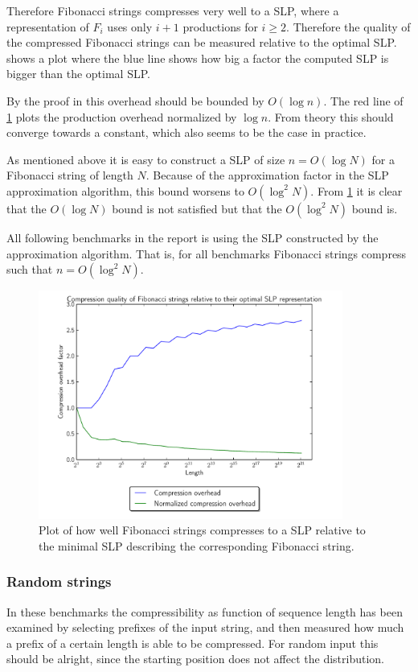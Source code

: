 \documentclass[twoside,11pt,openright]{report}
\begin{document}
Therefore Fibonacci strings compresses very well to a SLP, where a representation of $F_{i}$ uses only $i + 1$ productions for $i \geq 2$. Therefore the quality of the compressed Fibonacci strings can be measured relative to the optimal SLP.  shows a plot where the blue line shows how big a factor the computed SLP is bigger than the optimal SLP.

By the proof in \cite{Rytter2003211} this overhead should be bounded by $O(\log{n})$. The red line of \cref{fig:compression:quality:fibonacci} plots the production overhead normalized by $\log{n}$. From theory this should converge towards a constant, which also seems to be the case in practice.

As mentioned above it is easy to construct a SLP of size $n = O(\log{N})$ for a Fibonacci string of length $N$. Because of the approximation factor in the SLP approximation algorithm, this bound worsens to $O(\log^2{N})$. From \cref{fig:compression:quality:fibonacci} it is clear that the $O(\log{N})$ bound is not satisfied but that the $O(\log^2{N})$ bound is.

All following benchmarks in the report is using the SLP constructed by the approximation algorithm. That is, for all benchmarks Fibonacci strings compress such that $n = O(\log^2{N})$.
%
\begin{figure}[h!]
  \centering
  \includegraphics[width=10cm]{compression/fib}
  \caption{Plot of how well Fibonacci strings compresses to a SLP relative to the minimal SLP describing the corresponding Fibonacci string.}
  \label{fig:compression:quality:fibonacci}
\end{figure}

\subsubsection{Random strings}
In these benchmarks the compressibility as function of sequence length has been examined by selecting prefixes of the input string, and then measured how much a prefix of a certain length is able to be compressed. For random input this should be alright, since the starting position does not affect the distribution.
\end{document}
